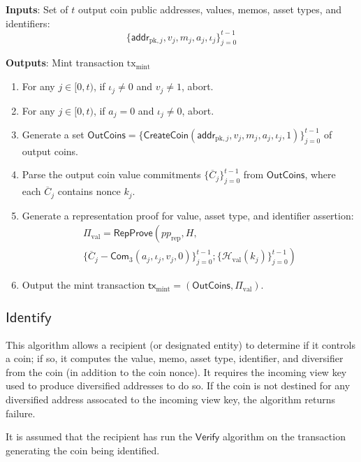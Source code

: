 \documentclass{article}
\newcommand{\func}[1]{\mathsf{#1}}
\newcommand{\addr}{\func{addr}}
\newcommand{\com}{\func{Com}}
\newcommand{\hash}{\mathcal{H}}
\begin{document}
\textbf{Inputs}: Set of $t$ output coin public addresses, values, memos, asset types, and identifiers: $$\{\addr_{\text{pk},j}, v_j, m_j, a_j, \iota_j\}_{j=0}^{t-1}$$

\textbf{Outputs}: Mint transaction $\text{tx}_{\text{mint}}$

\begin{enumerate}
    \item For any $j \in [0, t)$, if $\iota_j \neq 0$ and $v_j \neq 1$, abort.
    \item For any $j \in [0, t)$, if $a_j = 0$ and $\iota_j \neq 0$, abort.
    \item Generate a set $\func{OutCoins} = \{\func{CreateCoin}(\addr_{\text{pk},j}, v_j, m_j, a_j, \iota_j, 1)\}_{j=0}^{t-1}$ of output coins.
    \item Parse the output coin value commitments $\{\overline{C}_j\}_{j=0}^{t-1}$ from $\func{OutCoins}$, where each $\overline{C}_j$ contains nonce $k_j$.
    \item Generate a representation proof for value, asset type, and identifier assertion:
    \begin{multline*}
        \Pi_{\text{val}} = \func{RepProve}\left( pp_{\text{rep}}, H, \right. \\
        \left. \{ \overline{C}_j - \com_3(a_j, \iota_j, v_j, 0) \}_{j=0}^{t-1}; \{\hash_{\text{val}}(k_j)\}_{j=0}^{t-1} \right)
    \end{multline*}
    \item Output the mint transaction $\func{tx}_{\text{mint}} = (\func{OutCoins}, \Pi_{\text{val}})$.
\end{enumerate}


\subsection{\texorpdfstring{$\func{Identify}$}{Identify}}

This algorithm allows a recipient (or designated entity) to determine if it controls a coin; if so, it computes the value, memo, asset type, identifier, and diversifier from the coin (in addition to the coin nonce).
It requires the incoming view key used to produce diversified addresses to do so.
If the coin is not destined for any diversified address assocated to the incoming view key, the algorithm returns failure.

It is assumed that the recipient has run the $\func{Verify}$ algorithm on the transaction generating the coin being identified.
\end{document}
